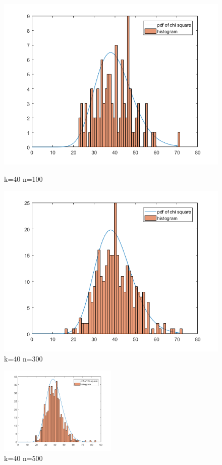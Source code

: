 \documentclass[10pt,a4paper]{report}
\begin{document}
\begin{figure}[ht]
\begin{minipage}[b]{0.5\linewidth}
\centering
\includegraphics[width=\textwidth]{k40n100.png}
\caption{k=40 n=100}
\end{minipage}
\hspace{0.5cm}
\begin{minipage}[b]{0.5\linewidth}
\centering
\includegraphics[width=\textwidth]{k40n300.png}
\caption{k=40 n=300}
\end{minipage}
\end{figure}

\begin{figure}[ht]
\centering
\includegraphics[width=0.5\textwidth]{k40n500.png}
\caption{k=40 n=500}
\end{figure}
\end{document}
